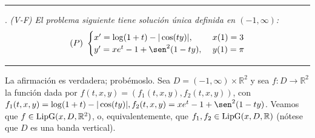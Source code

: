 \documentclass[11pt]{report}
\newcommand{\R}{\mathbb R}
\begin{document}
\vspace{4mm}

\hrule

\vspace{4mm}

. \textit{(V-F) El problema siguiente tiene solución única definida en $(-1,\infty)$:}
\[(P) \ \begin{cases}
    x'=\log(1+t)-|\cos(ty)|, \ & x(1)=3 \\
    y'=xe^t-1+\sen^2(1-ty), \ & y(1)=\pi
\end{cases}\]

\vspace{2mm}

\hrule

\vspace{4mm}

La afirmación es verdadera; probémoslo. Sea $D =(-1,\infty) \times \R^2$ y sea $f \colon D \to \R^2$ la función dada por $f(t,x,y)=(f_1(t,x,y),f_2(t,x,y))$, con $f_1(t,x,y)=\log(1+t)-|\cos(ty)|, f_2(t,x,y)=xe^t-1+\sen^2(1-ty)$. Veamos que $f \in \textup{LipG}(x,D,\R^2)$, o, equivalentemente, que $f_1,f_2 \in \textup{LipG}(x,D,\R)$ (nótese que $D$ es una banda vertical). 
\end{document}
